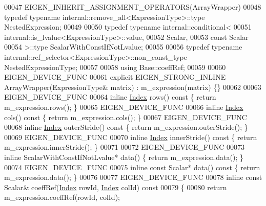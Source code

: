 \begin{DoxyCode}
00047     EIGEN\_INHERIT\_ASSIGNMENT\_OPERATORS(ArrayWrapper)
00048     \textcolor{keyword}{typedef} \textcolor{keyword}{typename} internal::remove\_all<ExpressionType>::type NestedExpression;
00049 
00050     \textcolor{keyword}{typedef} \textcolor{keyword}{typename} internal::conditional<
00051                        internal::is\_lvalue<ExpressionType>::value,
00052                        Scalar,
00053                        \textcolor{keyword}{const} Scalar
00054                      >::type ScalarWithConstIfNotLvalue;
00055 
00056     \textcolor{keyword}{typedef} \textcolor{keyword}{typename} internal::ref\_selector<ExpressionType>::non\_const\_type NestedExpressionType;
00057 
00058     \textcolor{keyword}{using} Base::coeffRef;
00059 
00060     EIGEN\_DEVICE\_FUNC
00061     \textcolor{keyword}{explicit} EIGEN\_STRONG\_INLINE ArrayWrapper(ExpressionType& matrix) : m\_expression(matrix) \{\}
00062 
00063     EIGEN\_DEVICE\_FUNC
00064     \textcolor{keyword}{inline} \hyperlink{namespace_eigen_a62e77e0933482dafde8fe197d9a2cfde}{Index} rows()\textcolor{keyword}{ const }\{ \textcolor{keywordflow}{return} m\_expression.rows(); \}
00065     EIGEN\_DEVICE\_FUNC
00066     \textcolor{keyword}{inline} \hyperlink{namespace_eigen_a62e77e0933482dafde8fe197d9a2cfde}{Index} cols()\textcolor{keyword}{ const }\{ \textcolor{keywordflow}{return} m\_expression.cols(); \}
00067     EIGEN\_DEVICE\_FUNC
00068     \textcolor{keyword}{inline} \hyperlink{namespace_eigen_a62e77e0933482dafde8fe197d9a2cfde}{Index} outerStride()\textcolor{keyword}{ const }\{ \textcolor{keywordflow}{return} m\_expression.outerStride(); \}
00069     EIGEN\_DEVICE\_FUNC
00070     \textcolor{keyword}{inline} \hyperlink{namespace_eigen_a62e77e0933482dafde8fe197d9a2cfde}{Index} innerStride()\textcolor{keyword}{ const }\{ \textcolor{keywordflow}{return} m\_expression.innerStride(); \}
00071 
00072     EIGEN\_DEVICE\_FUNC
00073     \textcolor{keyword}{inline} ScalarWithConstIfNotLvalue* data() \{ \textcolor{keywordflow}{return} m\_expression.data(); \}
00074     EIGEN\_DEVICE\_FUNC
00075     \textcolor{keyword}{inline} \textcolor{keyword}{const} Scalar* data()\textcolor{keyword}{ const }\{ \textcolor{keywordflow}{return} m\_expression.data(); \}
00076 
00077     EIGEN\_DEVICE\_FUNC
00078     \textcolor{keyword}{inline} \textcolor{keyword}{const} Scalar& coeffRef(\hyperlink{namespace_eigen_a62e77e0933482dafde8fe197d9a2cfde}{Index} rowId, \hyperlink{namespace_eigen_a62e77e0933482dafde8fe197d9a2cfde}{Index} colId)\textcolor{keyword}{ const}
00079 \textcolor{keyword}{    }\{
00080       \textcolor{keywordflow}{return} m\_expression.coeffRef(rowId, colId);

\end{DoxyCode}
